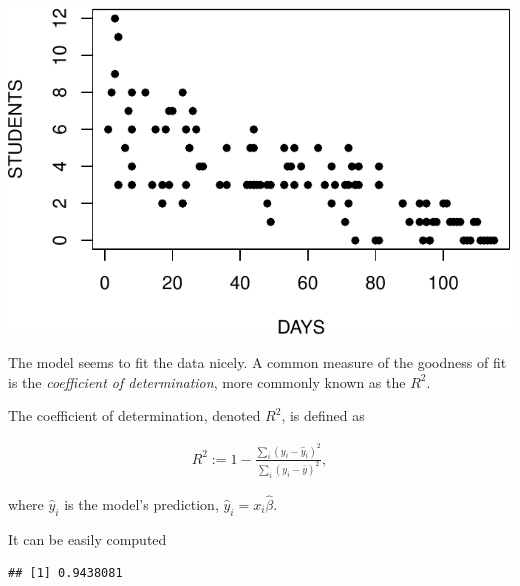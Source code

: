 \documentclass[]{book}
\newenvironment{Shaded}{\begin{snugshade}}{\end{snugshade}}
\newcommand{\KeywordTok}[1]{\textcolor[rgb]{0.13,0.29,0.53}{\textbf{#1}}}
\newcommand{\DataTypeTok}[1]{\textcolor[rgb]{0.13,0.29,0.53}{#1}}
\newcommand{\DecValTok}[1]{\textcolor[rgb]{0.00,0.00,0.81}{#1}}
\newcommand{\StringTok}[1]{\textcolor[rgb]{0.31,0.60,0.02}{#1}}
\newcommand{\ControlFlowTok}[1]{\textcolor[rgb]{0.13,0.29,0.53}{\textbf{#1}}}
\newcommand{\OperatorTok}[1]{\textcolor[rgb]{0.81,0.36,0.00}{\textbf{#1}}}
\newcommand{\NormalTok}[1]{#1}
\theoremstyle{definition}
\theoremstyle{definition}
\theoremstyle{definition}
\theoremstyle{remark}
\let\BeginKnitrBlock\begin \let\EndKnitrBlock\end
\begin{document}
\includegraphics[width=0.5\linewidth]{Rcourse_files/figure-latex/unnamed-chunk-139-1}

The model seems to fit the data nicely. A common measure of the goodness
of fit is the \emph{coefficient of determination}, more commonly known
as the \(R^2\).



\BeginKnitrBlock{definition}[R2]
\protect\hypertarget{def:unnamed-chunk-140}{}{\label{def:unnamed-chunk-140}
{} }The coefficient of determination, denoted \(R^2\),
is defined as

\begin{align}
  R^2:= 1-\frac{\sum_i (y_i - \hat y_i)^2}{\sum_i (y_i - \bar y)^2},
\end{align}

where \(\hat y_i\) is the model's prediction,
\(\hat y_i = x_i \hat \beta\).
\EndKnitrBlock{definition}

It can be easily computed

\begin{Shaded}
\end{Shaded}

\begin{verbatim}
## [1] 0.9438081
\end{verbatim}
\end{document}

